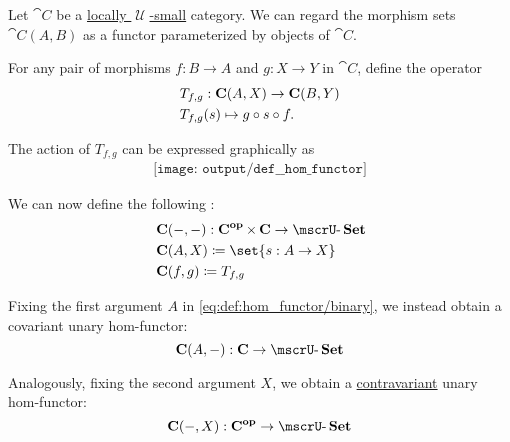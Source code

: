 \begin{definition}\label{def:hom_functor}
  Let \( \cat{C} \) be a \hyperref[def:category_size]{locally \( \mscrU \)-small} category. We can regard the morphism sets \( \cat{C}(A, B) \) as a functor parameterized by objects of \( \cat{C} \).

  \begin{thmenum}
     For any pair of morphisms \( f: B \to A \) and \( g: X \to Y \) in \( \cat{C} \), define the operator
    \begin{equation}\label{eq:def:hom_functor/t}
      \begin{aligned}
        &T_{f,g}: \cat{C}(A, X) \to \cat{C}(B, Y) \\
        &T_{f,g}(s) \mapsto g \bincirc s \bincirc f.
      \end{aligned}
    \end{equation}

    The action of \( T_{f,g} \) can be expressed graphically as
    \begin{equation}\label{eq:def:hom_functor/t_diagram}
      \begin{aligned}
        \texttt{[image: output/def\_\_hom\_functor]}
      \end{aligned}
    \end{equation}

    We can now define the following :
    \begin{equation}\label{eq:def:hom_functor/binary}
      \begin{aligned}
        &\cat{C}(\anon*, \anon*): \cat{C}^\oppos \times \cat{C} \to \ucat{Set} \\
        &\cat{C}(A, X) \coloneqq \set{ s: A \to X } \\
        &\cat{C}(f, g) \coloneqq T_{f,g}
      \end{aligned}
    \end{equation}

     Fixing the first argument \( A \) in \eqref{eq:def:hom_functor/binary}, we instead obtain a covariant unary hom-functor:
    \begin{equation}\label{eq:def:hom_functor/unary/covariant}
      \cat{C}(A, \anon*): \cat{C} \to \ucat{Set}
    \end{equation}

    Analogously, fixing the second argument \( X \), we obtain a \hyperref[def:hom_functor/unary]{contravariant} unary hom-functor:
    \begin{equation}\label{eq:def:hom_functor/unary/contravariant}
      \cat{C}(\anon*, X): \cat{C}^\oppos \to \ucat{Set}
    \end{equation}
  \end{thmenum}
\end{definition}

